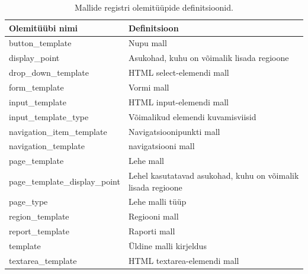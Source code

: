 \documentclass[a4paper,12pt]{article} %
\begin{document}
\begin{table}[H]
\centering
\caption{Mallide registri olemitüüpide definitsioonid.}
\label{table_er_mallide_registri_olemitüüpide_definitsioonid}
\begin{tabular}{|p{5cm}|p{10cm}|}
\hline
\rowcolor{rowgray}
Olemitüübi nimi & Definitsioon \\ \hline
button\_template & Nupu mall \\ \hline
display\_point & Asukohad, kuhu on võimalik lisada regioone \\ \hline
drop\_down\_template & HTML select-elemendi mall \\ \hline
form\_template & Vormi mall \\ \hline
input\_template & HTML input-elemendi mall \\ \hline
input\_template\_type & Võimalikud elemendi kuvamisviisid  \\ \hline
navigation\_item\_template & Navigatsioonipunkti mall \\ \hline
navigation\_template & navigatsiooni mall \\ \hline
page\_template & Lehe mall \\ \hline
page\_template\_display\_point & Lehel kasutatavad asukohad, kuhu on võimalik lisada regioone \\ \hline
page\_type & Lehe malli tüüp \\ \hline
region\_template & Regiooni mall \\ \hline
report\_template & Raporti mall \\ \hline
template & Üldine malli kirjeldus \\ \hline
textarea\_template & HTML textarea-elemendi mall \\ \hline
\end{tabular}
\end{table}
\end{document}
